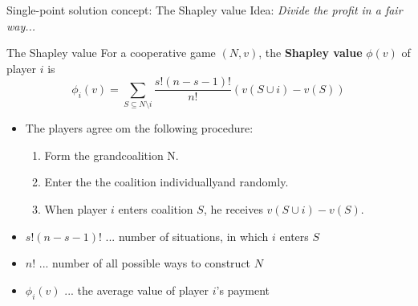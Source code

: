 \documentclass{beamer}
\begin{document}
\begin{frame}{Single-point solution concept: The Shapley value}
    Idea: \textit{Divide the profit in a fair way...}
    \begin{block}{The Shapley value}
        For a cooperative game $(N,v)$, the \textbf{Shapley value} $\phi(v)$ of player $i$ is
        \[
        \phi_i(v) = \sum_{S \subseteq N \setminus i}\frac{s!(n-s-1)!}{n!}\left(v(S \cup i) - v(S)\right)
        \]
    \end{block}
    \begin{itemize}
        \item The players agree om the following procedure:
        \begin{enumerate}
			\item Form the grandcoalition N.
			\item Enter the the coalition individuallyand randomly.
			\item When player $i$ enters coalition $S$, he receives $v\left(S \cup i\right)-v\left(S\right)$.
		\end{enumerate}
		\item $s!\left(n-s-1\right)!$ ... number of situations, in which $i$ enters $S$
		\item $n!$ ... number of all possible ways to construct $N$
		\item $\phi_i(v)$ ... the average value of player $i$'s payment
    \end{itemize}
\end{frame}


\end{document}
